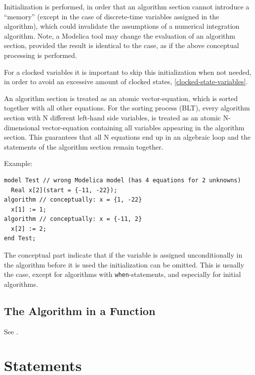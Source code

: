 \begin{nonnormative}
Initialization is performed, in order that an algorithm section cannot introduce a ``memory'' (except in the case of discrete-time variables assigned in the algorithm), which could invalidate the assumptions of a numerical integration algorithm.
Note, a Modelica tool may change the evaluation of an algorithm section, provided the result is identical to the case, as if the above conceptual processing is performed.

For a clocked variables it is important to skip this initialization when not needed, in order to avoid an excessive amount of clocked states, \cref{clocked-state-variables}.

An algorithm section is treated as an atomic vector-equation, which is sorted together with all other equations.
For the sorting process (BLT), every algorithm section with N different left-hand side variables, is treated as an atomic N-dimensional vector-equation containing all variables appearing in the algorithm section.
This guarantees that all N equations end up in an algebraic loop and the statements of the algorithm section remain together.

Example:
\begin{lstlisting}[language=modelica]
model Test // wrong Modelica model (has 4 equations for 2 unknowns)
  Real x[2](start = {-11, -22});
algorithm // conceptually: x = {1, -22}
  x[1] := 1;
algorithm // conceptually: x = {-11, 2}
  x[2] := 2;
end Test;
\end{lstlisting}

The conceptual part indicate that if the variable is assigned unconditionally in the algorithm before it is used the initialization can be omitted.
This is usually the case, except for algorithms with \lstinline!when!-statements, and especially for initial algorithms.
\end{nonnormative}


\subsection{The Algorithm in a Function}\label{execution-of-the-algorithm-in-a-function}\label{the-algorithm-in-a-function}

See .


\section{Statements}\label{statements}

